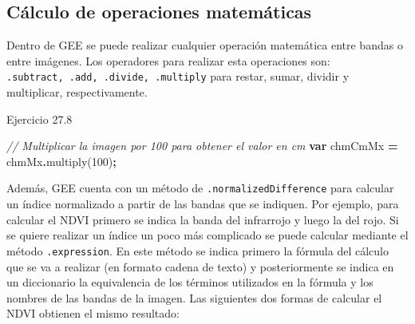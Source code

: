 \documentclass[
  12pt,
  letterpaper,
  twoside]{book}
\newenvironment{Shaded}{\begin{snugshade}}{\end{snugshade}}
\newcommand{\CommentTok}[1]{\textcolor[rgb]{0.56,0.35,0.01}{\textit{#1}}}
\newcommand{\DecValTok}[1]{\textcolor[rgb]{0.00,0.00,0.81}{#1}}
\newcommand{\FunctionTok}[1]{\textcolor[rgb]{0.00,0.00,0.00}{#1}}
\newcommand{\KeywordTok}[1]{\textcolor[rgb]{0.13,0.29,0.53}{\textbf{#1}}}
\newcommand{\NormalTok}[1]{#1}
\newcommand{\OperatorTok}[1]{\textcolor[rgb]{0.81,0.36,0.00}{\textbf{#1}}}
\begin{document}
\hypertarget{cuxe1lculo-de-operaciones-matemuxe1ticas}{%
\subsection{Cálculo de operaciones matemáticas}\label{cuxe1lculo-de-operaciones-matemuxe1ticas}}

Dentro de GEE se puede realizar cualquier operación matemática entre bandas o entre imágenes. Los operadores para realizar esta operaciones son: \texttt{.subtract,\ .add,\ .divide,\ .multiply} para restar, sumar, dividir y multiplicar, respectivamente.

Ejercicio 27.8

\begin{Shaded}
\begin{Highlighting}[]
\CommentTok{// Multiplicar la imagen por 100 para obtener el valor en cm}
\KeywordTok{var}\NormalTok{ chmCmMx }\OperatorTok{=}\NormalTok{ chmMx}\OperatorTok{.}\FunctionTok{multiply}\NormalTok{(}\DecValTok{100}\NormalTok{)}\OperatorTok{;}
\end{Highlighting}
\end{Shaded}

Además, GEE cuenta con un método de \texttt{.normalizedDifference} para calcular un índice normalizado a partir de las bandas que se indiquen. Por ejemplo, para calcular el NDVI primero se indica la banda del infrarrojo y luego la del rojo. Si se quiere realizar un índice un poco más complicado se puede calcular mediante el método \texttt{.expression}. En este método se indica primero la fórmula del cálculo que se va a realizar (en formato cadena de texto) y posteriormente se indica en un diccionario la equivalencia de los términos utilizados en la fórmula y los nombres de las bandas de la imagen. Las siguientes dos formas de calcular el NDVI obtienen el mismo resultado:
\end{document}
